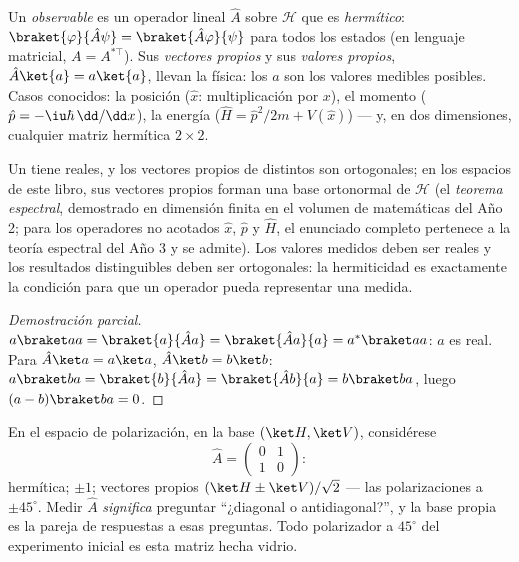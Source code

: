 \begin{definition}[Observables]\label{def:b3:quantum-formalism:observable}
Un \emph{observable} es un operador lineal $\hat A$ sobre $\mathcal H$
que es \emph{hermítico}: $\braket{\varphi}{\hat A\psi} =
\braket{\hat A\varphi}{\psi}$ para todos los estados (en lenguaje matricial,
$A = A^{*\top}$). Sus \emph{vectores propios} y sus \emph{valores propios},
$\hat A\ket{a} = a\ket{a}$, llevan la física: los $a$ son los
valores medibles posibles. Casos conocidos: la posición ($\hat x$:
multiplicación por $x$), el momento ($\hat p = -\iu\hbar\,\dd/\dd x$),
la energía ($\hat H = \hat p^2/2m + V(\hat x)$) --- y, en dos
dimensiones, cualquier matriz hermítica $2\times2$.
\end{definition}

\begin{theorem}\label{thm:b3:quantum-formalism:hermitian}
Un  tiene  reales, y los vectores propios
de  distintos son ortogonales; en los espacios de este libro,
sus vectores propios forman una base ortonormal de $\mathcal H$ (el
\emph{teorema espectral}, demostrado en dimensión finita en el volumen de
matemáticas del Año 2; para los operadores no acotados $\hat x$, $\hat p$ y
$\hat H$, el enunciado completo pertenece a la teoría espectral del Año 3 y
se admite). Los valores medidos deben ser reales y los resultados
distinguibles deben ser ortogonales: la hermiticidad es exactamente la
condición para que un operador pueda representar una medida.
\end{theorem}

\begin{proof}[Demostración parcial]
$a\braket aa = \braket{a}{\hat Aa} = \braket{\hat Aa}{a} =
a^*\braket aa$: $a$ es real. Para $\hat A\ket a = a\ket a$, $\hat A\ket b
= b\ket b$: $a\braket ba = \braket{b}{\hat Aa} = \braket{\hat
Ab}{a} = b\braket ba$, luego $(a - b)\braket ba = 0$.
\end{proof}

\begin{example}\label{ex:b3:quantum-formalism:twolevel}
En el espacio de polarización, en la base $(\ket H, \ket V)$, considérese
\[
\hat A = \begin{pmatrix} 0 & 1\\ 1 & 0\end{pmatrix} :
\]
hermítica;  $\pm1$; vectores propios $(\ket H \pm
\ket V)/\sqrt2$ --- las polarizaciones a $\pm45^\circ$. Medir
$\hat A$ \emph{significa} preguntar ``¿diagonal o antidiagonal?'', y la
base propia es la pareja de respuestas a esas preguntas. Todo polarizador a
$45^\circ$ del experimento inicial es esta matriz hecha vidrio.
\end{example}

